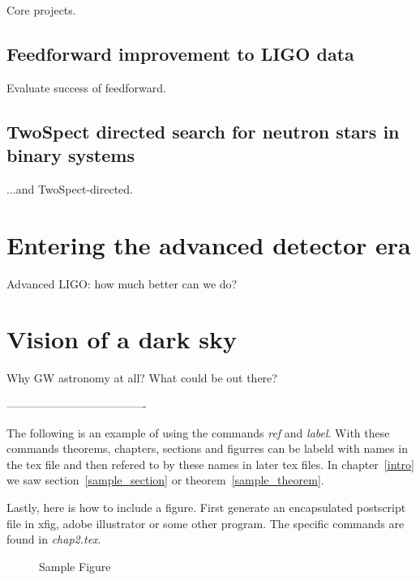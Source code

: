         Core projects.

        \subsection{Feedforward improvement to LIGO data}
        \label{feedforward_end}

            Evaluate success of feedforward.

        \subsection{TwoSpect directed search for neutron stars in binary systems}
        \label{TwoSpect_end}

            ...and TwoSpect-directed.

    \section{Entering the advanced detector era}
    \label{advanced_detector_era}

        Advanced LIGO: how much better can we do?

    \section{Vision of a dark sky}
    \label{dark_sky}

        Why GW astronomy at all? What could be out there?

        -------------------------------------

	The following is an example of using the commands \textit{ref}
	and \textit{label}. With these commands theorems, chapters,
	sections and figurres can be labeld with names in the tex file
	and then refered to by these names in later tex files. In
	chapter~\ref{intro} we saw section~\ref{sample_section} or
	theorem~\ref{sample_theorem}.

	Lastly, here is how to include a figure. First generate an
	encapsulated postscript file in xfig, adobe illustrator or
	some other program. The specific commands are found in
	\textit{chap2.tex}.

        \begin{figure}[htb]
        \centerline{ }
        \caption{Sample Figure}
        \label{sample_figure}
        \end{figure}


